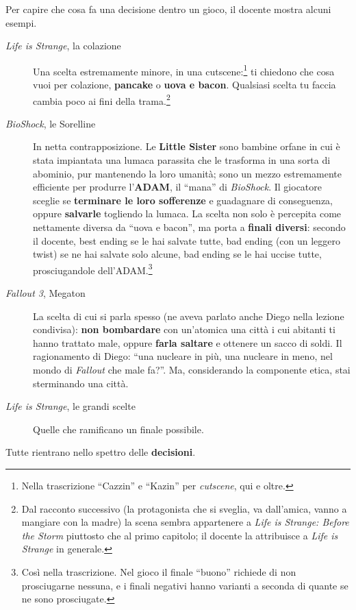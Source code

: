Per capire che cosa fa una decisione dentro un gioco, il docente mostra
alcuni esempi.
\begin{description}
  \item[\emph{Life is Strange}, la colazione] Una scelta estremamente
        minore, in una cutscene:\footnote{Nella trascrizione ``Cazzin'' e
        ``Kazin'' per \emph{cutscene}, qui e oltre.} ti chiedono che cosa
        vuoi per colazione, \textbf{pancake} o \textbf{uova e bacon}.
        Qualsiasi scelta tu faccia cambia poco ai fini della
        trama.\footnote{Dal racconto successivo (la protagonista che si
        sveglia, va dall'amica, vanno a mangiare con la madre) la scena
        sembra appartenere a \emph{Life is Strange: Before the Storm}
        piuttosto che al primo capitolo; il docente la attribuisce a
        \emph{Life is Strange} in generale.}
  \item[\emph{BioShock}, le Sorelline] In netta contrapposizione. Le
        \textbf{Little Sister} sono bambine orfane in cui è stata impiantata
        una lumaca parassita che le trasforma in una sorta di abominio,
        pur mantenendo la loro umanità; sono un mezzo estremamente efficiente
        per produrre l'\textbf{ADAM}, il ``mana'' di \emph{BioShock}. Il
        giocatore sceglie se \textbf{terminare le loro sofferenze} e
        guadagnare di conseguenza, oppure \textbf{salvarle} togliendo la
        lumaca. La scelta non solo è percepita come nettamente diversa da
        ``uova e bacon'', ma porta a \textbf{finali diversi}: secondo il
        docente, best ending se le hai salvate tutte, bad ending (con un
        leggero twist) se ne hai salvate solo alcune, bad ending se le hai
        uccise tutte, prosciugandole dell'ADAM.\footnote{Così nella
        trascrizione. Nel gioco il finale ``buono'' richiede di non
        prosciugarne nessuna, e i finali negativi hanno varianti a seconda
        di quante se ne sono prosciugate.}
  \item[\emph{Fallout 3}, Megaton] La scelta di cui si parla spesso (ne
        aveva parlato anche Diego nella lezione condivisa): \textbf{non
        bombardare} con un'atomica una città i cui abitanti ti hanno trattato
        male, oppure \textbf{farla saltare} e ottenere un sacco di soldi. Il
        ragionamento di Diego: ``una nucleare in più, una nucleare in meno,
        nel mondo di \emph{Fallout} che male fa?''. Ma, considerando la
        componente etica, stai sterminando una città.
  \item[\emph{Life is Strange}, le grandi scelte] Quelle che ramificano un
        finale possibile.
\end{description}
Tutte rientrano nello spettro delle \textbf{decisioni}.

